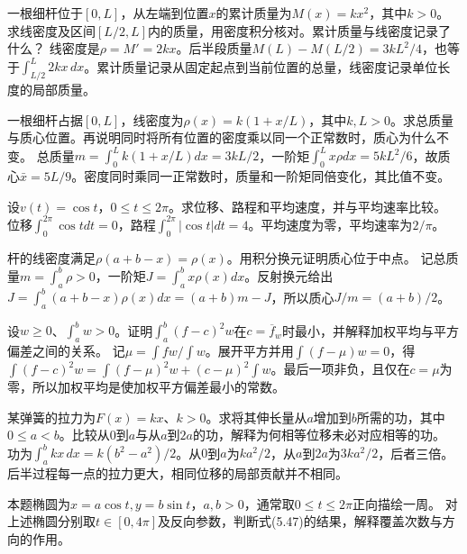 一根细杆位于\([0,L]\)，从左端到位置\(x\)的累计质量为\(M(x)=kx^2\)，其中\(k>0\)。求线密度及区间\([L/2,L]\)内的质量，用密度积分核对。累计质量与线密度记录了什么？
\solutionanswer
线密度是\(\rho=M'=2kx\)。后半段质量\(M(L)-M(L/2)=3kL^2/4\)，也等于\(\int_{L/2}^L2kx\,dx\)。累计质量记录从固定起点到当前位置的总量，线密度记录单位长度的局部质量。


一根细杆占据\([0,L]\)，线密度为\(\rho(x)=k(1+x/L)\)，其中\(k,L>0\)。求总质量与质心位置。再说明同时将所有位置的密度乘以同一个正常数时，质心为什么不变。
\solutionanswer
总质量\(m=\int_0^Lk(1+x/L)dx=3kL/2\)，一阶矩\(\int_0^Lx\rho dx=5kL^2/6\)，故质心\(\bar x=5L/9\)。密度同时乘同一正常数时，质量和一阶矩同倍变化，其比值不变。


设\(v(t)=\cos t\)，\(0\le t\le2\pi\)。求位移、路程和平均速度，并与平均速率比较。
\solutionanswer
位移\(\int_0^{2\pi}\cos tdt=0\)，路程\(\int_0^{2\pi}|\cos t|dt=4\)。平均速度为零，平均速率为\(2/\pi\)。


杆的线密度满足\(\rho(a+b-x)=\rho(x)\)。用积分换元证明质心位于中点。
\solutionanswer
记总质量\(m=\int_a^b\rho>0\)，一阶矩\(J=\int_a^bx\rho(x)dx\)。反射换元给出\(J=\int_a^b(a+b-x)\rho(x)dx=(a+b)m-J\)，所以质心\(J/m=(a+b)/2\)。


设\(w\ge0\)、\(\int_a^bw>0\)。证明\(\int_a^b(f-c)^2w\)在\(c=\overline f_w\)时最小，并解释加权平均与平方偏差之间的关系。
\solutionanswer
记\(\mu=\int fw/\int w\)。展开平方并用\(\int(f-\mu)w=0\)，得\(\int(f-c)^2w=\int(f-\mu)^2w+(c-\mu)^2\int w\)。最后一项非负，且仅在\(c=\mu\)为零，所以加权平均是使加权平方偏差最小的常数。


某弹簧的拉力为\(F(x)=kx\)、\(k>0\)。求将其伸长量从\(a\)增加到\(b\)所需的功，其中\(0\le a<b\)。比较从\(0\)到\(a\)与从\(a\)到\(2a\)的功，解释为何相等位移未必对应相等的功。
\solutionanswer
功为\(\int_a^bkx\,dx=k(b^2-a^2)/2\)。从\(0\)到\(a\)为\(ka^2/2\)，从\(a\)到\(2a\)为\(3ka^2/2\)，后者三倍。后半过程每一点的拉力更大，相同位移的局部贡献并不相同。


本题椭圆为\(x=a\cos t,y=b\sin t\)，\(a,b>0\)，通常取\(0\le t\le2\pi\)正向描绘一周。
对上述椭圆分别取\(t\in[0,4\pi]\)及反向参数，判断式\textup{(5.47)}的结果，解释覆盖次数与方向的作用。

